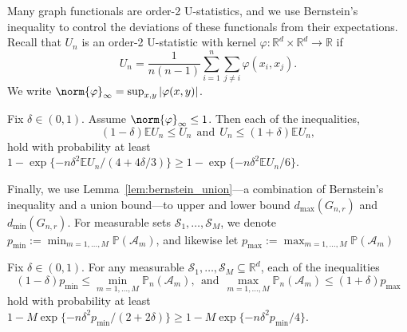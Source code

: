 \documentclass[twoside,11pt]{article}
\newcommand{\Reals}{\mathbb{R}}
\newcommand{\1}{\mathbf{1}}
\newcommand{\Rd}{\Reals^d}
\newcommand{\mc}[1]{\mathcal{#1}}
\newcommand{\Pbb}{\mathbb{P}}
\newcommand{\Ebb}{\mathbb{E}}
\begin{document}
Many graph functionals are order-2 U-statistics, and we use Bernstein's inequality to control the deviations of these functionals from their expectations. Recall that $U_n$ is an order-2 U-statistic with kernel $\varphi: \Rd \times \Rd \to \Reals$ if 
\begin{equation*}
U_n = \frac{1}{n(n-1)}\sum_{i = 1}^{n} \sum_{j \neq i} \varphi(x_i,x_j).
\end{equation*}
We write $\norm{\varphi}_{\infty} = \sup_{x,y} |\varphi(x,y)|$. 
\begin{lemma}
	\label{lem:hoeffding}
	Fix $\delta \in (0,1)$. Assume $\norm{\varphi}_{\infty} \leq 1$. Then each of the inequalities,
	\begin{equation*}
	(1 - \delta) \mathbb{E}U_n \leq U_n~~\textrm{and}~~ U_n\leq (1 + \delta) \mathbb{E}U_n,
	\end{equation*}
	hold with probability at least $1 - \exp\{-n\delta^2 \Ebb U_n/(4 + 4\delta/3)\} \geq 1 - \exp\{-n\delta^2 \Ebb U_n/6\}$.
\end{lemma}

Finally, we use Lemma~\ref{lem:bernstein_union}---a combination of Bernstein's inequality and a union bound---to upper and lower bound $d_{\max}(G_{n,r})$ and $d_{\min}(G_{n,r})$. For measurable sets $\mc{S}_1,\ldots,\mc{S}_M$, we denote $p_{\min} := \min_{m = 1,\ldots,M} \Pbb(\mathcal{A}_m)$, and likewise let $p_{\max} := \max_{m = 1,\ldots,M} \Pbb(\mathcal{A}_m)$
\begin{lemma}
	\label{lem:bernstein_union}
	Fix $\delta \in (0,1)$. For any measurable $\mathcal{S}_1,\ldots,\mathcal{S}_M \subseteq \Rd$, each of the inequalities
	\begin{equation*}
	(1 - \delta) p_{\min} \leq \min_{m = 1,\ldots,M} \Pbb_n(\mathcal{A}_m),~~\textrm{and}~~\max_{m = 1,\ldots,M}  \Pbb_n(\mathcal{A}_m) \leq (1 + \delta) p_{\max}
	\end{equation*}
	hold with probability at least $1 - M \exp \{-n\delta^2p_{\min}/(2 + 2\delta) \} \geq 1 - M \exp\{-n\delta^2p_{\min}/4\}$.  
\end{lemma}
\end{document}
